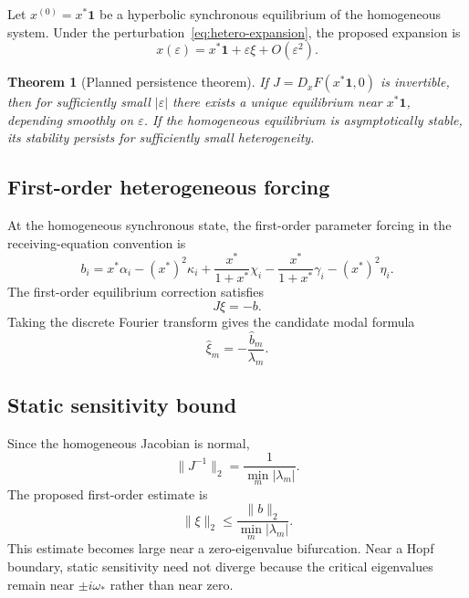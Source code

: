 \documentclass[11pt, reqno]{amsart}
\newtheorem{theorem}{Theorem}[section]
\theoremstyle{definition}
\theoremstyle{remark}
\newcommand{\eps}{\varepsilon}
\newcommand{\one}{\mathbf{1}}
\begin{document}
Let $x^{(0)}=x^*\one$ be a hyperbolic synchronous equilibrium of the homogeneous
system.  Under the perturbation~\eqref{eq:hetero-expansion}, the proposed
expansion is
\begin{equation}
\label{eq:heterogeneous-equilibrium-expansion}
    x(\eps)
    =
    x^*\one+\eps\xi+O(\eps^2).
\end{equation}

\begin{theorem}[Planned persistence theorem]
If $J=D_xF(x^*\one,0)$ is invertible, then for sufficiently small $|\eps|$
there exists a unique equilibrium near $x^*\one$, depending smoothly on
$\eps$.  If the homogeneous equilibrium is asymptotically stable, its stability
persists for sufficiently small heterogeneity.
\end{theorem}


\subsection{First-order heterogeneous forcing}

At the homogeneous synchronous state, the first-order parameter forcing in the
receiving-equation convention is
\begin{equation}
\label{eq:heterogeneity-forcing}
    b_i
    =
    x^*\alpha_i
    -(x^*)^2\kappa_i
    +\frac{x^*}{1+x^*}\chi_i
    -\frac{x^*}{1+x^*}\gamma_i
    -(x^*)^2\eta_i.
\end{equation}
The first-order equilibrium correction satisfies
\begin{equation}
\label{eq:Jxi}
    J\xi=-b.
\end{equation}
Taking the discrete Fourier transform gives the candidate modal formula
\begin{equation}
\label{eq:xi-Fourier}
\boxed{
    \widehat\xi_m
    =
    -\frac{\widehat b_m}{\lambda_m}.
}
\end{equation}


\subsection{Static sensitivity bound}

Since the homogeneous Jacobian is normal,
\begin{equation}
\label{eq:Jinverse-norm}
    \|J^{-1}\|_2
    =
    \frac{1}{\min_m|\lambda_m|}.
\end{equation}
The proposed first-order estimate is
\begin{equation}
\label{eq:static-sensitivity-bound}
    \|\xi\|_2
    \le
    \frac{\|b\|_2}{\min_m|\lambda_m|}.
\end{equation}
This estimate becomes large near a zero-eigenvalue bifurcation.  Near a Hopf
boundary, static sensitivity need not diverge because the critical eigenvalues
remain near $\pm i\omega_*$ rather than near zero.
\end{document}
